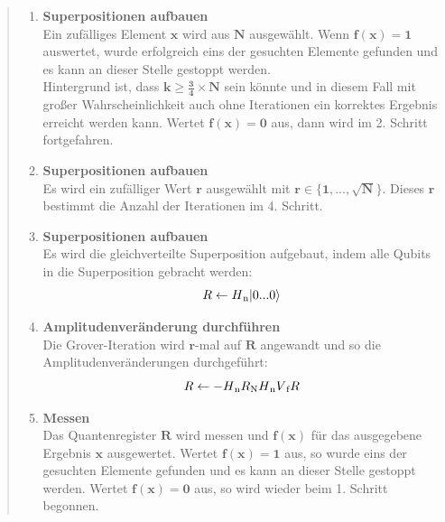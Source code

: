 \begin{quote}
    \begin{enumerate}
        \item \textbf{Superpositionen aufbauen}
        \\
        Ein zufälliges Element $\mathbf{x}$ wird aus $\mathbf{N}$ ausgewählt. Wenn $\mathbf{f(x) = 1}$ auswertet, wurde erfolgreich eins der gesuchten Elemente gefunden und es kann an dieser Stelle gestoppt werden. 
        \\
        Hintergrund ist, dass $\mathbf{k \geq \frac{3}{4} \times N}$ sein könnte und in diesem Fall mit großer Wahrscheinlichkeit auch ohne Iterationen ein korrektes Ergebnis erreicht werden kann. Wertet $\mathbf{f(x) = 0}$ aus, dann wird im 2. Schritt fortgefahren.
        \item \textbf{Superpositionen aufbauen}
        \\
        Es wird ein zufälliger Wert $\mathbf{r}$ ausgewählt mit $\mathbf{r \in \{ 1, ..., \sqrt{N} \}}$. Dieses $\mathbf{r}$ bestimmt die Anzahl der Iterationen im 4. Schritt.
        \item \textbf{Superpositionen aufbauen}
        \\
        Es wird die gleichverteilte Superposition aufgebaut, indem alle Qubits in die Superposition gebracht werden:
        \begin{equation}
            R \leftarrow H\textsubscript{n} |0 ... 0\rangle 
        \end{equation}
        \item \textbf{Amplitudenveränderung durchführen}
        \\
        Die Grover-Iteration wird $\mathbf{r}$-mal auf $\mathbf{R}$ angewandt und so die Amplitudenveränderungen durchgeführt:
        \begin{equation}
            R \leftarrow -H\textsubscript{n} R\textsubscript{N} H\textsubscript{n} V\textsubscript{f} R
        \end{equation}
        \item \textbf{Messen}
        \\
        Das Quantenregister $\mathbf{R}$ wird messen und $\mathbf{f(x)}$ für das ausgegebene Ergebnis $\mathbf{x}$ ausgewertet. Wertet $\mathbf{f(x) = 1}$ aus, so wurde eins der gesuchten Elemente gefunden und es kann an dieser Stelle gestoppt werden. Wertet $\mathbf{f(x) = 0}$ aus, so wird wieder beim 1. Schritt begonnen.
    \end{enumerate}
\end{quote}

